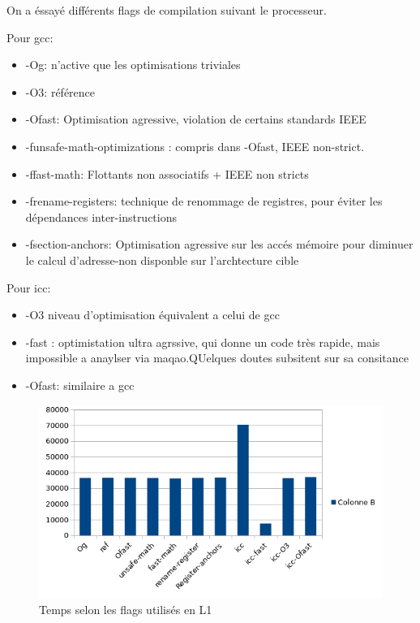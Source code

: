 \documentclass{report}
\begin{document}
On a éssayé différents flags de compilation suivant le processeur.

Pour gcc:
\begin{itemize}
    \item{-Og: n'active que les optimisations triviales}
    \item{-O3: référence }
    \item{-Ofast: Optimisation agressive, violation de certains standards IEEE }
    \item{-funsafe-math-optimizations : compris dans -Ofast, IEEE non-strict.}
    \item{-ffast-math: Flottants non associatifs + IEEE non stricts}
    \item{-frename-registers: technique de renommage de registres, pour éviter les dépendances inter-instructions}
    \item{-fsection-anchors: Optimisation agressive sur les accés mémoire pour diminuer le calcul d'adresse-non disponble sur l'archtecture cible}
\end{itemize}

Pour icc:
\begin{itemize}
    \item{-O3 niveau d'optimisation équivalent a celui de gcc}
    \item{-fast : optimistation ultra agrssive, qui donne un code très rapide, mais impossible a anaylser via maqao.QUelques doutes subsitent sur sa consitance}
    \item {-Ofast: similaire a gcc}
\end{itemize}

\newpage
   \begin{figure}[ht!]
        \centering
        \includegraphics[width=120mm]{MEDIA/time_L1.png}
        \caption{Temps selon les flags utilisés en L1}
    \end{figure}
\end{document}
